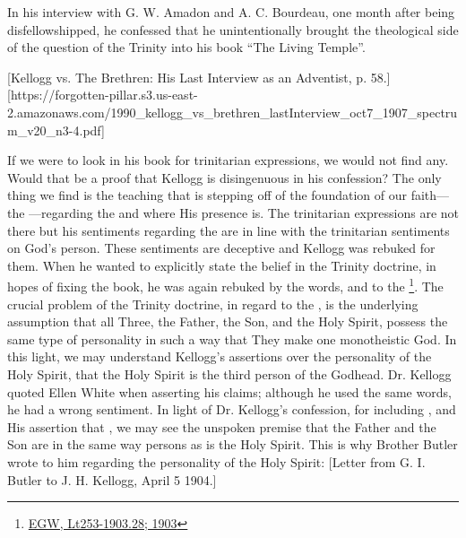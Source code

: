 In his interview with G. W. Amadon and A. C. Bourdeau, one month after being disfellowshipped, he confessed that he unintentionally brought the theological side of the question of the Trinity into his book “The Living Temple”.

[Kellogg vs. The Brethren: His Last Interview as an Adventist, p. 58.][https://forgotten-pillar.s3.us-east-2.amazonaws.com/1990\_kellogg\_vs\_brethren\_lastInterview\_oct7\_1907\_spectrum\_v20\_n3-4.pdf]

If we were to look in his book for trinitarian expressions, we would not find any. Would that be a proof that Kellogg is disingenuous in his confession? The only thing we find is the teaching that is stepping off of the foundation of our faith—the —regarding the  and where His presence is. The trinitarian expressions are not there but his sentiments regarding the  are in line with the trinitarian sentiments on God’s person. These sentiments are deceptive and Kellogg was rebuked for them. When he wanted to explicitly state the belief in the Trinity doctrine, in hopes of fixing the book, he was again rebuked by the words,  and to the \footnote{\href{https://egwwritings.org/?ref=en_Lt253-1903.28&para=9980.36}{EGW, Lt253-1903.28; 1903}}. The crucial problem of the Trinity doctrine, in regard to the , is the underlying assumption that all Three, the Father, the Son, and the Holy Spirit, possess the same type of personality in such a way that They make one monotheistic God. In this light, we may understand Kellogg's assertions over the personality of the Holy Spirit, that the Holy Spirit is the third person of the Godhead. Dr. Kellogg quoted Ellen White when asserting his claims; although he used the same words, he had a wrong sentiment. In light of Dr. Kellogg’s confession, for including , and His assertion that , we may see the unspoken premise that the Father and the Son are in the same way persons as is the Holy Spirit. This is why Brother Butler wrote to him regarding the personality of the Holy Spirit: [Letter from G. I. Butler to J. H. Kellogg, April 5 1904.]


